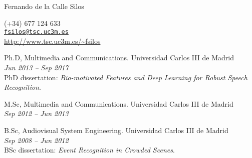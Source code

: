 \documentclass[10pt]{scrartcl}
\begin{document}
\date{}
\thispagestyle{empty} %


\begin{cv}{\spacedallcaps Fernando de la Calle Silos}\vspace{0.5em} %

{\footnotesize
\Telefon  \hspace{0.4em} (+34) 677 124 633 \hspace{0.4em} \\ \hspace{0.4em}  \Letter   \hspace{0.4em} \href{mailto:fsilos@tsc.uc3m.es}{\texttt{fsilos@tsc.uc3m.es}} \hspace{0.4em} \\   \hspace{0.4em}  \Mundus \hspace{0.4em} \url{http://www.tsc.uc3m.es/~fsilos}
}


\vspace{1em} %


\vspace{1em}

{Ph.D, Multimedia and Communications.}  \hfill  Universidad Carlos III de Madrid\\
\textit{Jun 2013 -- Sep 2017} \\ 
PhD dissertation: \textit{Bio-motivated Features and Deep Learning for Robust Speech Recognition}. 
\vspace{0.5em}

{M.Sc, Multimedia and Communications.}   \hfill Universidad Carlos III de Madrid\\ \textit{Sep 2012 -- Jun 2013} %
\vspace{0.5em}

{B.Sc, Audiovisual System Engineering.}  \hfill Universidad Carlos III de Madrid\\ \textit{Sep 2008 -- Jun 2012}\\ %
BSc dissertation: \textit{Event Recognition in Crowded Scenes}. 
\vspace{1em}



\end{cv}
\end{document}
